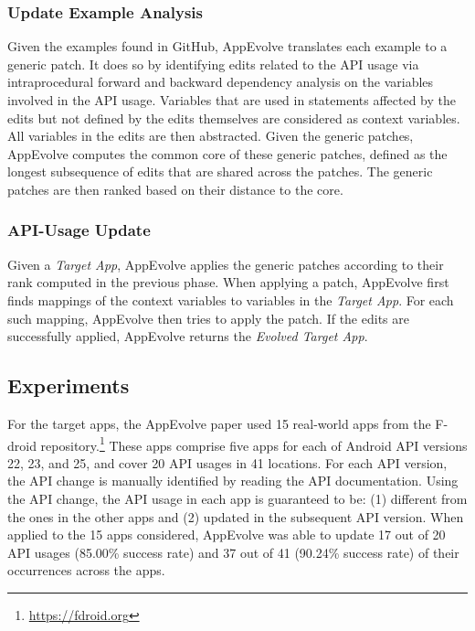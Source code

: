\subsubsection{Update Example Analysis}
Given the examples found in GitHub, AppEvolve translates each example to a
generic patch. It does so by identifying edits related to the API usage via
intraprocedural forward and backward dependency analysis on the variables
involved in the API usage. Variables that are used in statements affected
by the edits but not defined by the edits themselves are considered as
context variables. All variables in the edits are then abstracted. Given
the generic patches, AppEvolve computes the common core of these generic
patches, defined as the longest subsequence of edits that are shared across
the patches. The generic patches are then ranked based on their distance to
the core.

\subsubsection{API-Usage Update}
Given a {\em Target App}, AppEvolve applies the generic patches according
to their rank computed in the previous phase. When applying a patch,
AppEvolve first finds mappings of the context variables to variables in the
{\em Target App}. For each such mapping, AppEvolve then tries to apply the
patch. If the edits are successfully applied, AppEvolve returns the {\em
  Evolved Target App}.

\subsection{Experiments}
For the target apps, the AppEvolve paper used 15 real-world apps from the
F-droid repository.\footnote{\url{https://fdroid.org}} These apps comprise
five apps for each of Android API versions 22, 23, and 25, and cover 20 API
usages in 41 locations. For each API version, the API change is manually
identified by reading the API documentation. Using the API change, the API
usage in each app is guaranteed to be: (1) different from the ones in the
other apps and (2) updated in the subsequent API version.  When applied to
the 15 apps considered, AppEvolve was able to update 17 out of 20 API
usages (85.00\% success rate) and 37 out of 41 (90.24\% success rate) of their occurrences across
the apps. %

